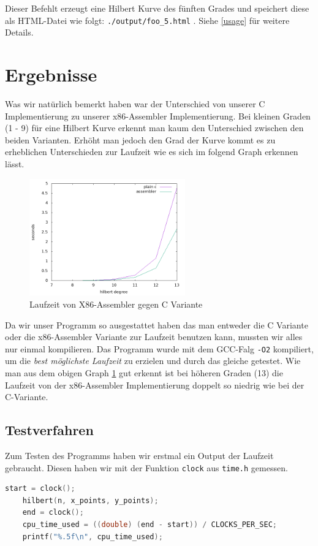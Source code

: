 \documentclass[course=erap]{aspdoc}
\begin{document}
Dieser Befehlt erzeugt eine Hilbert Kurve des fünften Grades und speichert
diese als HTML-Datei wie folgt: \lstinline{./output/foo_5.html} . Siehe
\ref{usage} für weitere Details.


\section{Ergebnisse}
Was wir natürlich bemerkt haben war der Unterschied von unserer C
Implementierung zu unserer x86-Assembler Implementierung. Bei kleinen Graden (1
- 9) für eine Hilbert Kurve erkennt man kaum den Unterschied zwischen den beiden
Varianten. Erhöht man jedoch den Grad der Kurve kommt es zu erheblichen
Unterschieden zur Laufzeit wie es sich im folgend Graph erkennen lässt.
\begin{figure}[H]
    \label{fig:results}
    \centering
    \includegraphics[width=0.6\textwidth]{../img/result-plot.png}
    \caption{Laufzeit von X86-Assembler gegen C Variante}
\end{figure}

Da wir unser Programm so ausgestattet haben das man entweder die C Variante oder
die x86-Assembler Variante zur Laufzeit benutzen kann, mussten wir alles nur
einmal kompilieren. Das Programm wurde mit dem GCC-Falg \lstinline{-O2}
kompiliert, um die \textit{best möglichste Laufzeit}\cite{gcc-optimazation} zu
erzielen und durch das gleiche getestet. Wie man aus dem obigen Graph
\ref{fig:results} gut erkennt ist bei höheren Graden (13) die Laufzeit von der
x86-Assembler Implementierung doppelt so niedrig wie bei der C-Variante.

\subsection{Testverfahren}
Zum Testen des Programms haben wir erstmal ein Output der Laufzeit gebraucht.
Diesen haben wir mit der Funktion \lstinline{clock} aus \lstinline{time.h}
gemessen.
\begin{lstlisting}[language=c,caption={Zeitmessung des Algorithmus},belowcaptionskip=0.6cm]
    start = clock();
    hilbert(n, x_points, y_points);
    end = clock();
    cpu_time_used = ((double) (end - start)) / CLOCKS_PER_SEC;
    printf("%.5f\n", cpu_time_used);
\end{lstlisting}
\end{document}
